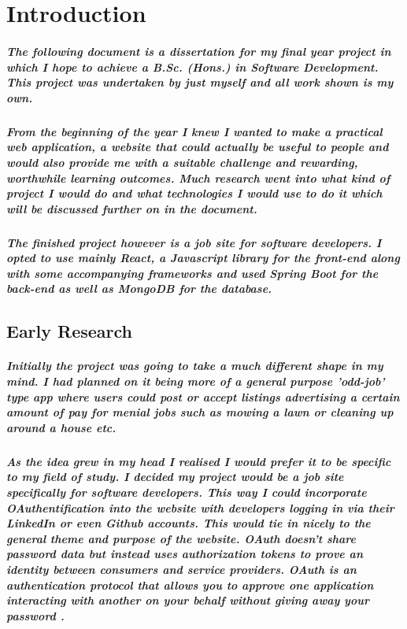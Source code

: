 \chapter{Introduction}
\paragraph{The following document is a dissertation for my final year project in which I hope to achieve a B.Sc. (Hons.) in Software Development. This project was undertaken by just myself and all work shown is my own.}
\paragraph{From the beginning of the year I knew I wanted to make a practical web application, a website that could actually be useful to people and would also provide me with a suitable challenge and rewarding, worthwhile learning outcomes. Much research went into what kind of project I would do and what technologies I would use to do it which will be discussed further on in the document.}
\paragraph{The finished project however is a job site for software developers. I opted to use mainly React, a Javascript library for the front-end along with some accompanying frameworks and used Spring Boot for the back-end as well as MongoDB for the database.}

\section{Early Research}
\paragraph{Initially the project was going to take a much different shape in my mind. I had planned on it being more of a general purpose 'odd-job' type app where users could post or accept listings advertising a certain amount of pay for menial jobs such as mowing a lawn or cleaning up around a house etc.}

\paragraph{As the idea grew in my head I realised I would prefer it to be specific to my field of study. I decided my project would be a job site specifically for software developers. This way I could incorporate OAuthentification into the website with developers logging in via their LinkedIn or even Github accounts. This would tie in nicely to the general theme and purpose of the website. OAuth doesn't share password data but instead uses authorization tokens to prove an identity between consumers and service providers. OAuth is an authentication protocol that allows you to approve one application interacting with another on your behalf without giving away your password \cite{OAuth}.}

